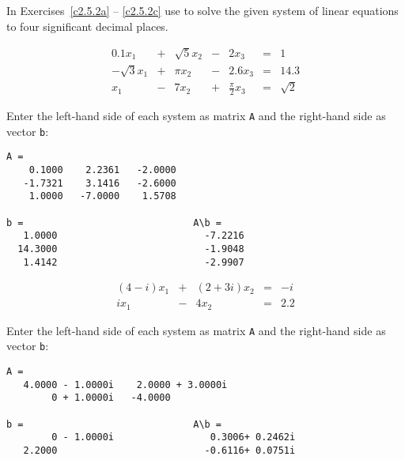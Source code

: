 \documentclass{ximera}
\begin{document}
\noindent In Exercises~\ref{c2.5.2a} -- \ref{c2.5.2c} use \Matlab to
solve the given system of linear equations to four significant decimal places.
\begin{computerExercise} \label{c2.5.2a}
\[
\begin{array}{rcrcrcr}
     0.1 x_1 & + & \sqrt{5}x_2 & - &   2 x_3 & = & 1 \\
-\sqrt{3}x_1 & + &     \pi x_2 & - & 2.6 x_3 & = & 14.3 \\
         x_1 & - &       7 x_2 & + & \frac{\pi}{2}x_3 & = & \sqrt{2}
\end{array}
\]

\begin{solution}

Enter the left-hand side of each system as matrix {\tt A} 
and the right-hand side as vector {\tt b}:

\begin{verbatim}
A =                           
    0.1000    2.2361   -2.0000
   -1.7321    3.1416   -2.6000
    1.0000   -7.0000    1.5708

b =                              A\b =
   1.0000                          -7.2216
  14.3000                          -1.9048
   1.4142                          -2.9907
\end{verbatim}

\end{solution}
\end{computerExercise}
\begin{computerExercise} \label{c2.5.2b}
\[
\begin{array}{rcrcr}
(4-i)x_1 & + & (2+3i)x_2 & = &  -i \\
   i x_1 & - &     4 x_2 & = & 2.2
\end{array}
\]

\begin{solution}

Enter the left-hand side of each system as matrix {\tt A} 
and the right-hand side as vector {\tt b}:

\begin{verbatim}
A =
   4.0000 - 1.0000i    2.0000 + 3.0000i
        0 + 1.0000i   -4.0000          

b =                              A\b =
        0 - 1.0000i                 0.3006+ 0.2462i
   2.2000                          -0.6116+ 0.0751i
\end{verbatim}

\end{solution}
\end{computerExercise}
\end{document}
